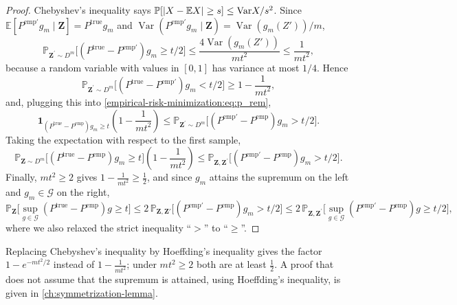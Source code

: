 \begin{notechapter}
\begin{proof}
Chebyshev's inequality says \(\mathbb{P}[|X-\mathbb{E}X|\geq s]\leq{\rm Var}X/s^{2}\). Since \(\mathbb{E}[P^{\text{emp}'}g_m \mid \mathbf{Z}] = P^{\text{true}}g_m\) and \(\operatorname{Var}(P^{\text{emp}'}g_m \mid \mathbf{Z}) = \operatorname{Var}(g_m(Z'))/m\),
\[
\mathbb{P}_{\mathbf{Z}^{\prime}\sim D^{m}}\big[(P^{\text{true}}-P^{\text{emp}'})g_{m}\geq t/2\big]\leq\frac{4\operatorname{Var}(g_m(Z'))}{mt^{2}} \leq \frac{1}{mt^{2}},
\]
because a random variable with values in \([0,1]\) has variance at most \(1/4\). Hence
\[
\mathbb{P}_{\mathbf{Z}^{\prime}\sim D^{m}}\big[(P^{\text{true}}-P^{\text{emp}'})g_{m}<t/2\big]\geq 1-\frac{1}{mt^{2}},
\]
and, plugging this into \eqref{empirical-risk-minimization:eq:p_rem},
\[
\mathbf{1}_{(P^{\text{true}}-P^{\text{emp}})g_{m}\geq t}\left(1-\frac {1}{mt^{2}}\right)
\leq \mathbb{P}_{\mathbf{Z}^{\prime}\sim D^{m}}\big[(P^{\text{emp}'}-P^{\text{emp}})g_{m}>t/2\big].
\]
Taking the expectation with respect to the first sample,
\[
\mathbb{P}_{\mathbf{Z}\sim D^{m}}\big[(P^{\text{true}}-P^{\text{emp}})g_{m}\geq t\big]\left(1-\frac{1}{mt^{2}}\right)\leq\mathbb{P}_{\mathbf{Z}, \mathbf{Z}^{\prime}}\big[(P^{\text{emp}'}-P^{\text{emp}})g_{m}>t/2\big].
\]
Finally, \(mt^{2} \geq 2\) gives \(1-\frac{1}{mt^{2}} \geq \frac{1}{2}\), and since \(g_m\) attains the supremum on the left and \(g_m \in \mathcal{G}\) on the right,
\[
\mathbb{P}_{\mathbf{Z}}\Big[\sup_{g\in\mathcal{G}}(P^{\text{true}}-P^{\text{emp}})g\geq t\Big] \leq 2\,\mathbb{P}_{\mathbf{Z}, \mathbf{Z}'}\big[(P^{\text{emp}'}-P^{\text{emp}})g_{m}>t/2\big]
\leq 2\,\mathbb{P}_{\mathbf{Z},\mathbf{Z}^{\prime}}\Big[\sup_{g\in\mathcal{G}}(P^{\text{emp}'}-P^{\text{emp}})g\geq t/2\Big],
\]
where we also relaxed the strict inequality ``\(>\)'' to ``\(\geq\)''.
\end{proof}

\begin{remark}
Replacing Chebyshev's inequality by Hoeffding's inequality gives the factor \(1 - e^{-mt^2/2}\) instead of \(1 - \frac{1}{mt^2}\); under \(mt^2 \geq 2\) both are at least \(\frac{1}{2}\). A proof that does not assume that the supremum is attained, using Hoeffding's inequality, is given in \cref{ch:symmetrization-lemma}.
\end{remark}
\end{notechapter}
